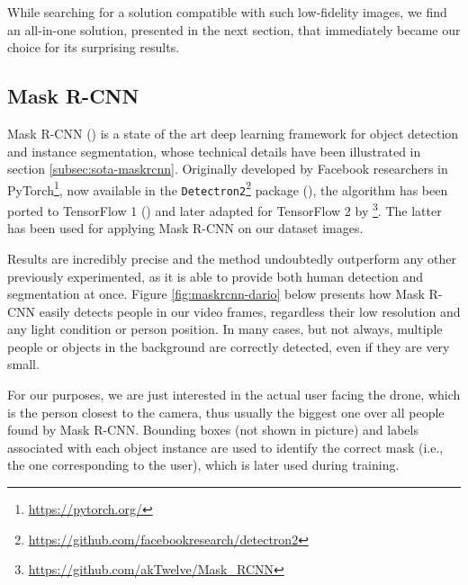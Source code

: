 While searching for a solution compatible with such low-fidelity images, we find an all-in-one solution, presented in the next section, that immediately became our choice for its surprising results.



\subsection{Mask R-CNN}
\label{subsec:masking-maskrcnn}

Mask R-CNN (\cite{he2018mask}) is a state of the art deep learning framework for object detection and instance segmentation, whose technical details have been illustrated in section \ref{subsec:sota-maskrcnn}. Originally developed by Facebook researchers in PyTorch\footnote{\url{https://pytorch.org/}}, now available in the \texttt{Detectron2}\footnote{\url{https://github.com/facebookresearch/detectron2}} package (\cite{wu2019detectron2}), the algorithm has been ported to TensorFlow 1 (\cite{MaskRCNN_matterport}) and later adapted for TensorFlow 2 by \cite{MaskRCNN_akTwelve}\footnote{\url{https://github.com/akTwelve/Mask_RCNN}}. The latter has been used for applying Mask R-CNN on our dataset images.

\medskip

Results are incredibly precise and the method undoubtedly outperform any other previously experimented, as it is able to provide both human detection and segmentation at once. Figure \ref{fig:maskrcnn-dario} below presents how Mask R-CNN easily detects people in our video frames, regardless their low resolution and any light condition or person position. In many cases, but not always, multiple people or objects in the background are correctly detected, even if they are very small.

For our purposes, we are just interested in the actual user facing the drone, which is the person closest to the camera, thus usually the biggest one over all people found by Mask R-CNN. Bounding boxes (not shown in picture) and labels associated with each object instance are used to identify the correct mask (i.e., the one corresponding to the user), which is later used during training.

